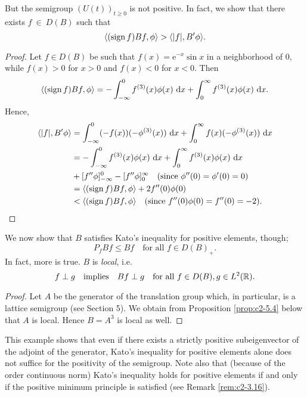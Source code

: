 But the semigroup $(U(t))_{t \geq 0}$ is not positive. 
In fact, we show that there exists $f~\in~D(B)$ such that
\begin{equation}\label{eq:c2-3.19}
\langle(\operatorname{sign}  f)Bf,\phi\rangle > \langle|f|,B'\phi\rangle.
\end{equation}
\begin{proof}
Let $f \in D(B)$ be such that $f(x) = \mathrm{e}^{-x} \sin x$ in a neighborhood of $0$, while $f(x) > 0$ for $x > 0$ and $f(x) < 0$ for $x < 0$. 
Then
\begin{align*}
\langle(\operatorname{sign}  f)Bf,\phi\rangle = - \int_{-\infty}^{0} f^{(3)}(x)\phi(x) \, \mathop{}\!\mathrm{d}{x} + \int_{0}^{\infty} f^{(3)}(x)\phi(x) \, \mathop{}\!\mathrm{d}{x}.
\end{align*}
Hence, 
\begin{align*}
\langle|f|,B'\phi\rangle &= \int_{-\infty}^{0} (-f(x))(-\phi^{(3)}(x)) \, \mathop{}\!\mathrm{d}{x} + \int_{0}^{\infty} f(x)(-\phi^{(3)}(x)) \, \mathop{}\!\mathrm{d}{x}\\
&= - \int_{-\infty}^{0} f^{(3)}(x)\phi(x) \, \mathop{}\!\mathrm{d}{x} + \int_{0}^{\infty} f^{(3)}(x)\phi(x) \, \mathop{}\!\mathrm{d}{x}\\
&+ [f''\phi]_{-\infty}^{0} - [f''\phi]_{0}^{\infty} \quad \text{(since $\phi''(0)=\phi'(0)=0$)}\\
&= \langle(\operatorname{sign}  f) Bf,\phi\rangle + 2f''(0)\phi(0)\\
&< \langle(\operatorname{sign}  f) Bf,\phi\rangle \quad \text{(since $f''(0)\phi(0) = f''(0) = -2$)}.
\end{align*}
\phantom{x}
\end{proof}
We now show that $B$ satisfies Kato's inequality for positive elements, though; \ie
\begin{equation}\label{eq:c2-3.20}
P_{f} Bf \leq Bf \quad \text{for all } f \in D(B)_{+}.
\end{equation}
In fact, more is true. $B$ is \emph{local}, i.e.
\begin{equation}\label{eq:c2-3.21}
f \perp g \quad \text{implies} \quad Bf \perp g \quad \text{for all } f \in D(B), g \in L^{2}(\mathbb{R}).
\end{equation}
\begin{proof}
Let $A$ be the generator of the translation group which, in particular, is a lattice semigroup (see Section 5). We obtain from Proposition \ref{prop:c2-5.4} below that $A$ is local. 
Hence $B = A^{3}$ is local as well.
\end{proof}
This example shows that even if there exists a strictly positive subeigenvector of the adjoint of the generator, Kato's inequality for positive elements alone does not suffice for the positivity of the semigroup. 
Note also that (because of the order continuous norm) Kato's inequality holds for positive elements if and only if the positive minimum principle is satisfied (see Remark \ref{rem:c2-3.16}).

